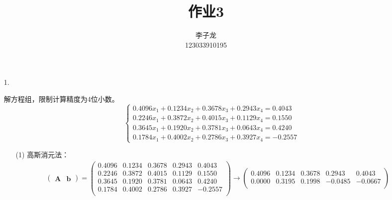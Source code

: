 \documentclass{sjtuarticle}
\title{作业3}
\author{李子龙\\123033910195}
\begin{document}
\maketitle

\begin{itemize}
    \item[1.] 
    \begin{solution}
        解方程组，限制计算精度为4位小数。
        \begin{equation*}
            \begin{cases}
                0.4096x_1+0.1234x_2+0.3678x_3+0.2943x_4=0.4043 \\
                0.2246x_1+0.3872x_2+0.4015x_3+0.1129x_4=0.1550 \\
                0.3645x_1+0.1920x_2+0.3781x_3+0.0643x_4=0.4240 \\
                0.1784x_1+0.4002x_2+0.2786x_3+0.3927x_4=-0.2557
            \end{cases}
        \end{equation*}
        \begin{itemize}
            \item[(1)] 高斯消元法：
        \begin{align*}
            \begin{pmatrix}
                \bm{A} & \bm{b}
            \end{pmatrix}=\begin{pmatrix}
                0.4096 &       0.1234 &       0.3678 &       0.2943 &        0.4043\\
                0.2246 &       0.3872 &       0.4015 &       0.1129 &        0.1550\\
                0.3645 &       0.1920 &       0.3781 &       0.0643 &        0.4240\\
                0.1784 &       0.4002 &       0.2786 &       0.3927 &       -0.2557\\
            \end{pmatrix}\rightarrow
            \begin{pmatrix}
                0.4096 &       0.1234 &       0.3678 &       0.2943 &        0.4043\\
                0.0000 &       0.3195 &       0.1998 &      -0.0485 &       -0.0667\\

\end{pmatrix}
\end{align*}
\end{itemize}
\end{solution}
\end{itemize}
\end{document}
